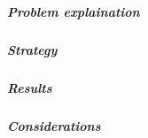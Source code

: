 \subparagraph*{Problem explaination}
\subparagraph*{Strategy}
\subparagraph*{Results}
\subparagraph*{Considerations}